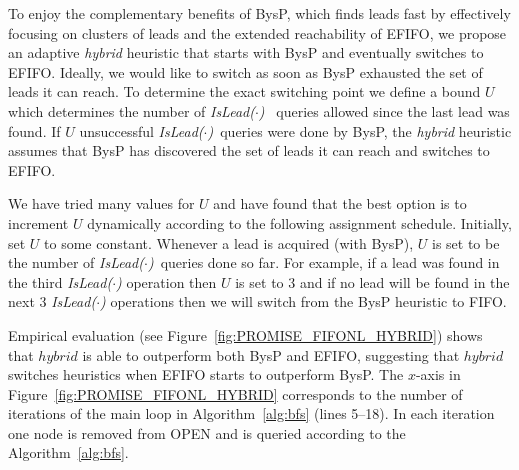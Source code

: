 \documentclass[prodmode,acmtecs]{acmsmall} %
\newcommand{\islead}[1]{{\em IsLead(#1)}}
\begin{document}
To enjoy the complementary benefits of BysP, which finds leads fast by effectively focusing on clusters of leads and the extended reachability of EFIFO, we propose an adaptive {\em hybrid} heuristic that starts with BysP and eventually switches to EFIFO. Ideally, we would like to switch as soon as BysP exhausted the set of leads it can reach. To determine the exact switching point we define a bound \(U\) which determines the number of \islead{$\cdot$}~ queries allowed since the last lead was found. If \(U\) unsuccessful \islead{$\cdot$}~queries were done by BysP, the \emph{hybrid} heuristic assumes that BysP has discovered the set of leads it can reach and switches to EFIFO.

We have tried many values for $U$ and have found that the best option is to increment $U$ dynamically according to the following assignment schedule. Initially, set $U$ to some constant. Whenever a lead is acquired (with BysP), $U$ is set to be the number of \islead{$\cdot$}~queries done so far. For example, if a lead was found in the third \islead{$\cdot$} operation then $U$ is set to 3 and if no lead will be found in the next 3 \islead{$\cdot$} operations then we will switch from the BysP heuristic to FIFO. 


Empirical evaluation (see Figure~\ref{fig:PROMISE_FIFONL_HYBRID}) shows that \(hybrid\) is able to outperform both BysP and EFIFO, suggesting that $hybrid$ switches heuristics when EFIFO starts to outperform BysP. 
The $x$-axis in Figure~\ref{fig:PROMISE_FIFONL_HYBRID} corresponds to the number of iterations of the main loop in Algorithm~\ref{alg:bfs} (lines 5--18). 
In each iteration one node is removed from OPEN and is queried according to the Algorithm~\ref{alg:bfs}.

\end{document}
